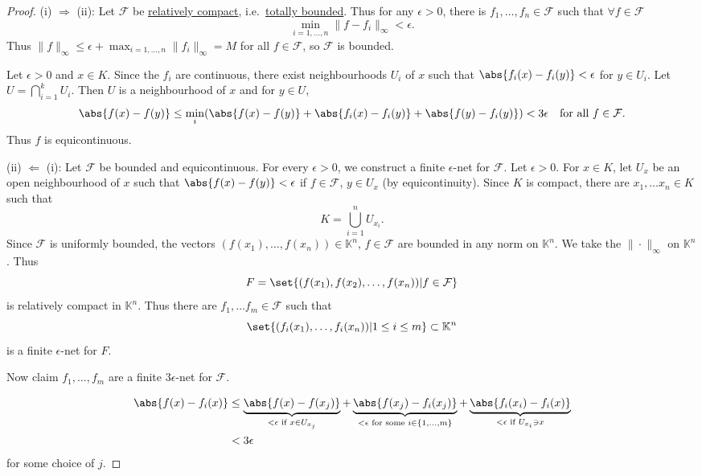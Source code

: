 \documentclass{article}
\newcommand{\K}{\mathbb{K}}
\begin{document}
\begin{proof}
    (i) $\Rightarrow$ (ii):
    Let $\mathcal{F}$ be \hyperlink{def:relCompact}{relatively compact}, i.e.\ \hyperlink{def:totBound}{totally bounded}.
    Thus for any $\epsilon > 0$, there is $f_1, \dotsc, f_n \in \mathcal{F}$ such that $\forall f \in \mathcal{F}$
    \begin{equation*}
        \min_{i=1, \dotsc, n} \|f - f_i\|_\infty < \epsilon.
    \end{equation*}
    Thus $\|f\|_\infty \leq \epsilon + \max_{i = 1, \dotsc, n} \|f_i\|_\infty = M$ for all $f \in \mathcal{F}$, so $\mathcal{F}$ is bounded.

    Let $\epsilon > 0$ and $x \in K$.
    Since the $f_i$ are continuous, there exist neighbourhoods $U_i$ of $x$ such that $\abs{f_i(x) - f_i(y)} < \epsilon$ for $y \in U_i$.
    Let $U = \bigcap_{i=1}^k U_i$. Then $U$ is a neighbourhood of $x$ and for $y \in U$,
    \begin{equation*}
        \abs{f(x) - f(y)} \leq \min_i(\abs{f(x) - f(y)} + \abs{f_i(x) - f_i(y)} + \abs{f(y) - f_i(y)}) < 3\epsilon \quad \text{for all } f \in \mathcal{F}.
    \end{equation*}
    Thus $f$ is equicontinuous.

    (ii) $\Leftarrow$  (i):
    Let $\mathcal{F}$ be bounded and equicontinuous. For every $\epsilon > 0$, we construct a finite $\epsilon$-net for $\mathcal{F}$. Let $\epsilon > 0$.
    For $x \in K$, let $U_x$ be an open neighbourhood of $x$ such that $\abs{f(x) - f(y)} < \epsilon$ if $f \in \mathcal{F}$, $y \in U_x$ (by equicontinuity). Since $K$ is compact, there are $x_1, \dotsc x_n \in K$ such that
    \begin{equation*}
        K = \bigcup_{i=1}^n U_{x_i}.
    \end{equation*}
    Since $\mathcal{F}$ is uniformly bounded, the vectors $(f(x_1), \dotsc, f(x_n)) \in \K^n$, $f \in \mathcal{F}$ are bounded in any norm on $\K^n$. We take the $\|\cdot\|_\infty$ on $\K^n$. Thus
    \begin{equation*}
        F = \set{(f(x_1), f(x_2), \dotsc, f(x_n)) | f \in \mathcal{F}}
    \end{equation*}
    is relatively compact in $\K^n$.
    Thus there are $f_1, \dotsc f_m \in \mathcal{F}$ such that
    \begin{equation*}
        \set{(f_i(x_1), \dotsc, f_i(x_n)) | 1 \leq i \leq m} \subset \K^n
    \end{equation*}
    is a finite $\epsilon$-net for $F$.

    Now claim $f_1, \dotsc, f_m$ are a finite $3\epsilon$-net for $\mathcal{F}$.

    \begin{align*}
        \abs{f(x) - f_i(x)} &\leq \underbrace{\abs{f(x) - f(x_j)}}_{< \epsilon \text{ if } x \in U_{x_j}} +
        \underbrace{\abs{f(x_j) - f_i(x_j)}}_{< \epsilon \text{ for some } i \in \{1, \dotsc, m\}} +
        \underbrace{\abs{f_i(x_i) - f_i(x)}}_{< \epsilon \text{ if } U_{x_i} \ni x} \\
            &< 3 \epsilon
    \end{align*}
    for some choice of $j$.
\end{proof}
\end{document}
